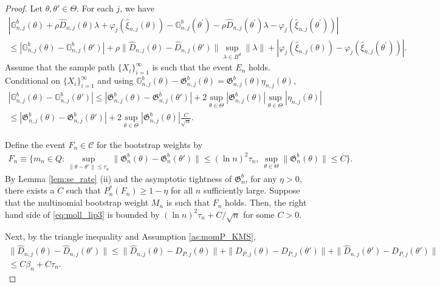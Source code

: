 \documentclass[letterpaper,11pt]{article}
\theoremstyle{myplain}
\theoremstyle{mydefinition}
\theoremstyle{myremark}
\numberwithin{equation}{section}
\numberwithin{figure}{section}
\begin{document}
\begin{appendices}
\begin{proof}
Let $\theta,\theta'\in \Theta$. For each $j$, we have
\begin{multline}
\left\vert\mathbb{G}_{n,j}^{b}(\theta )+\rho\hat{D}
_{n,j}(\theta)\lambda +\varphi_j(\hat{\xi}_{n,j}(\theta))-\mathbb{G}_{n,j}^{b}(\theta^\prime)-\rho\hat{D}
_{n,j}(\theta^\prime)\lambda -\varphi_j(\hat{\xi}_{n,j}(\theta^\prime))\right\vert \\\le 
|\mathbb{G}_{n,j}^{b}(\theta)-\mathbb{G}_{n,j}^{b}(\theta')|+\rho\|\hat D_{n,j}(\theta)-\hat D_{n,j}(\theta')\|\sup_{\lambda \in B^d}\|\lambda\|+|\varphi_j(\hat{\xi}_{n,j}(\theta))-\varphi_j(\hat{\xi}_{n,j}(\theta^\prime))|.\label{eq:moll_lip2}
\end{multline}
Assume that the sample path $\{X_i\}_{i=1}^\infty$ is such that the event $E_n$ holds. Conditional on $\{X_i\}_{i=1}^\infty$ and using $\mathbb{G}_{n,j}^{b}(\theta)-\mathfrak G^b_{n,j}(\theta)=\mathfrak G^b_{n,j}(\theta)\eta_{n,j}(\theta)$,
\begin{multline}
|\mathbb{G}_{n,j}^{b}(\theta)-\mathbb{G}_{n,j}^{b}(\theta')|\le |\mathfrak G^b_{n,j}(\theta)-\mathfrak G^b_{n,j}(\theta')|+2\sup_{\theta\in\Theta}|\mathfrak G^b_{n,j}(\theta)|\sup_{\theta\in\Theta}|\eta_{n,j}(\theta)|\\
\le |\mathfrak G^b_{n,j}(\theta)-\mathfrak G^b_{n,j}(\theta')|+2\sup_{\theta\in\Theta}|\mathfrak G^b_{n,j}(\theta)|\frac{C}{\sqrt n}.\label{eq:moll_lip3}
\end{multline}

Define the event $F_n\in \mathcal C$ for the bootstrap weights by
\begin{align}
F_n\equiv\big\{m_n\in Q:\sup_{\|\theta-\theta'\|\le\tau_n}\|\mathfrak G^b_{n}(\theta)-\mathfrak G^b_{n}(\theta')\|\le (\ln n)^2\tau_n,~\sup_{\theta\in\Theta}\|\mathfrak G^b_{n}(\theta)\|\le C\big\}.\label{eq:moll_lip4}
\end{align}
By Lemma \ref{lem:se_rate} (ii) and the asymptotic tightness of $\mathfrak G^b_n$, for any $\eta>0$, there exists a $C$ such that $P^*_n(F_n)\ge 1-\eta$ for all $n$ sufficiently large.
Suppose that the multinomial bootstrap weight $M_n$ is such that
$F_n$ holds. Then, the right hand side of \eqref{eq:moll_lip3} is bounded by
$(\ln n)^2\tau_n+ C/\sqrt n$ for some $C>0$.

Next, by the triangle inequality and Assumption \ref{as:momP_KMS},
\begin{multline}
\|\hat D_{n,j}(\theta)-\hat D_{n,j}(\theta')\|\le \|\hat D_{n,j}(\theta)-D_{P,j}(\theta)\|+\|D_{P,j}(\theta)-D_{P,j}(\theta')\|+\|\hat D_{n,j}(\theta')-D_{P,j}(\theta')\|\\
\le C\beta_n + C\tau_n.\label{eq:moll_lip5}
\end{multline}


\end{proof}
\end{appendices}
\end{document}
